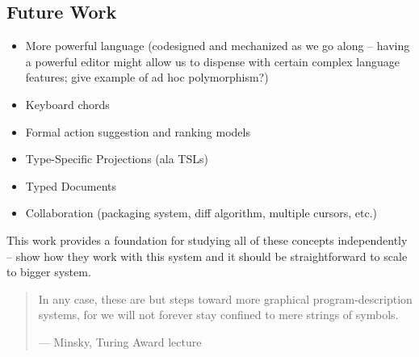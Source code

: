 \documentclass{llncs}
\begin{document}
\subsection{Future Work}
\begin{itemize}
\item More powerful language (codesigned and mechanized as we go along -- having a powerful editor might allow us to dispense with certain complex language features; give example of ad hoc polymorphism?)
\item Keyboard chords
\item Formal action suggestion and ranking models
\item Type-Specific Projections (ala TSLs)
\item Typed Documents
\item Collaboration (packaging system, diff algorithm, multiple cursors, etc.)
\end{itemize}

This work provides a foundation for studying all of these concepts independently -- show how they work with this system and it should be straightforward to scale to bigger system.

\begin{quote}
In any case, these are but steps toward more graphical program-description systems, for we will not forever stay confined to mere strings of symbols. 

--- Minsky, Turing Award lecture 
\end{quote}

%
%


\end{document}
